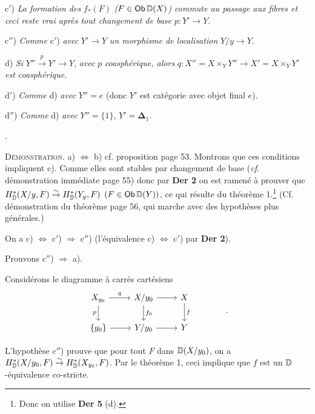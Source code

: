 c$'$) \textit{La formation des} $f_*(F)$ \textit{(}$F \in \mathsf{Ob}\, \mathbb{D}(X)$\textit{) commute au passage aux fibres et ceci reste vrai après tout changement de base} $p : Y' \to Y$.

c$''$) \textit{Comme} c$'$) \textit{avec} $Y' \to Y$ \textit{un morphisme de localisation} $Y/y \to Y$.

d) \textit{Si} $Y'' \overset{p}{\to} Y' \to Y$, \textit{avec} $p$ \textit{coasphérique, alors} $q : X'' = X \times_Y Y'' \to X' = X \times_Y Y'$ \textit{est coasphérique.}


d$'$) \textit{Comme} d) \textit{avec} $Y'' = e$ (donc $Y'$ est catégorie avec objet final $e$).

d$''$) \textit{Comme} d) \textit{avec} $Y'' = \{1\}$, $Y' = \boldsymbol{\Delta}_1$.

.

\noindent\textsc{Démonstration}. a) $\Leftrightarrow$ b) cf. proposition page 53. Montrons que ces conditions impliquent c). Comme elles sont stables par changement de base (\textit{cf.} démonstration immédiate page 55) donc par \textbf{Der 2} on est ramené à prouver que $H^*_{\mathbb{D}}(X/y, F) \overset{\sim}{\to} H^*_{\mathbb{D}}(Y_y, F)$ $(F \in \mathsf{Ob}\, \mathbb{D}(Y))$, ce qui résulte du théorème 1.\footnote[30]{Donc on utilise \textbf{Der 5} (d).} (Cf. démonstration du théorème page 56, qui marche avec des hypothèses plus générales.)

On a c) $\Leftrightarrow$ c$'$) $\Rightarrow$ c$''$) (l'équivalence c) $\Leftrightarrow$ c$'$) par \textbf{Der 2}).

Prouvons c$''$) $\Rightarrow$ a).


\noindent Considérons le diagramme à carrés cartésiens
\[
\begin{tikzcd}
X_{y_0} \arrow[r, "q"] \arrow[d, "p"{swap}] & X/y_0 \arrow[r] \arrow[d, "f_0"] & X \arrow[d, "f"] \\
\{y_0\} \arrow[r] & Y/y_0 \arrow[r] & Y
\end{tikzcd}
\qquad\qquad .
\]

\noindent L'hypothèse c$''$) prouve que pour tout $F$ dans $\mathbb{D}(X/y_0)$, on a $H^*_{\mathbb{D}}(X/y_0, F) \overset{\sim}{\to} H^*_{\mathbb{D}}(X_{y_0}, F)$. Par le théorème 1, ceci implique que $f$ est un $\mathbb{D}$-équivalence co-stricte. %

